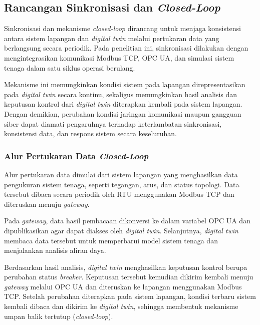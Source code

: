 \subsection{Rancangan Sinkronisasi dan \textit{Closed-Loop}}
\label{subsec:rancangan_sinkronisasi_closed_loop}

Sinkronisasi dan mekanisme \textit{closed-loop} dirancang untuk menjaga konsistensi antara sistem lapangan dan \textit{digital twin} melalui pertukaran data yang berlangsung secara periodik. Pada penelitian ini, sinkronisasi dilakukan dengan mengintegrasikan komunikasi Modbus TCP, OPC UA, dan simulasi sistem tenaga dalam satu siklus operasi berulang.

Mekanisme ini memungkinkan kondisi sistem pada lapangan direpresentasikan pada \textit{digital twin} secara kontinu, sekaligus memungkinkan hasil analisis dan keputusan kontrol dari \textit{digital twin} diterapkan kembali pada sistem lapangan. Dengan demikian, perubahan kondisi jaringan komunikasi maupun gangguan siber dapat diamati pengaruhnya terhadap keterlambatan sinkronisasi, konsistensi data, dan respons sistem secara keseluruhan.

\subsubsection{Alur Pertukaran Data \textit{Closed-Loop}}
\label{subsubsec:alur_pertukaran_data_closed_loop}

Alur pertukaran data dimulai dari sistem lapangan yang menghasilkan data pengukuran sistem tenaga, seperti tegangan, arus, dan status topologi. Data tersebut dibaca secara periodik oleh RTU menggunakan Modbus TCP dan diteruskan menuju \textit{gateway}.

Pada \textit{gateway}, data hasil pembacaan dikonversi ke dalam variabel OPC UA dan dipublikasikan agar dapat diakses oleh \textit{digital twin}. Selanjutnya, \textit{digital twin} membaca data tersebut untuk memperbarui model sistem tenaga dan menjalankan analisis aliran daya.

Berdasarkan hasil analisis, \textit{digital twin} menghasilkan keputusan kontrol berupa perubahan status \textit{breaker}. Keputusan tersebut kemudian dikirim kembali menuju \textit{gateway} melalui OPC UA dan diteruskan ke lapangan menggunakan Modbus TCP. Setelah perubahan diterapkan pada sistem lapangan, kondisi terbaru sistem kembali dibaca dan dikirim ke \textit{digital twin}, sehingga membentuk mekanisme umpan balik tertutup (\textit{closed-loop}).

